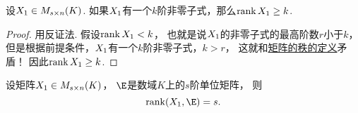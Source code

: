 \begin{theorem}
设\(X_1\in M_{s \times n}(K)\).
如果\(X_1\)有一个\(k\)阶非零子式，那么\(\rank X_1\geq k\).
\begin{proof}
用反证法.
假设\(\rank X_1<k\)，
也就是说\(X_1\)的非零子式的最高阶数\(r\)小于\(k\)，
但是根据前提条件，\(X_1\)有一个\(k\)阶非零子式，\(k>r\)，
这就和\hyperref[definition:线性方程组.矩阵的秩的定义]{矩阵的秩的定义}矛盾！
因此\(\rank X_1\geq k\).
\end{proof}
\end{theorem}
\begin{corollary}
设矩阵\(X_1 \in M_{s \times n}(K)\)，
\(\E\)是数域\(K\)上的\(s\)阶单位矩阵，
则\begin{equation*}
	\rank(\A,\E) = s.
\end{equation*}
\end{corollary}

